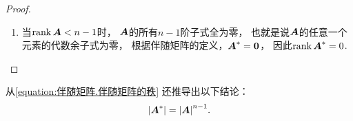 \begin{example}
\begin{proof}
\begin{enumerate}
	\item 当\(\rank\boldsymbol{A} < n-1\)时，
	\(\boldsymbol{A}\)的所有\(n-1\)阶子式全为零，
	也就是说\(\boldsymbol{A}\)的任意一个元素的代数余子式为零，
	根据伴随矩阵的定义，\(\boldsymbol{A}^* = \boldsymbol0\)，
	因此\(\rank\boldsymbol{A}^* = 0\).
	\qedhere
\end{enumerate}
\end{proof}
\end{example}
\begin{remark}
从\cref{equation:伴随矩阵.伴随矩阵的秩} 还推导出以下结论：
\begin{equation}\label{equation:伴随矩阵.伴随矩阵的行列式}
	\abs{\boldsymbol{A}^*}
	= \abs{\boldsymbol{A}}^{n-1}.
\end{equation}
\end{remark}

